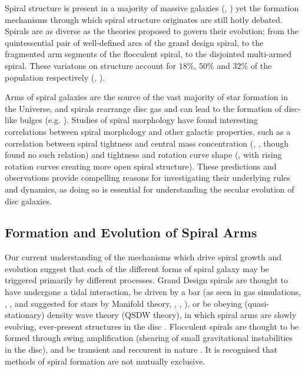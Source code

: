 
Spiral structure is present in a majority of massive galaxies (\citealt{1989gadv.book..151B}, \citealt{2008MNRAS.389.1179L}) yet the formation mechanisms through which spiral structure originates are still hotly debated. Spirals are as diverse as the theories proposed to govern their evolution; from the quintessential pair of well-defined arcs of the grand design spiral, to the fragmented arm segments of the flocculent spiral, to the disjointed multi-armed spiral. These variatons on structure account for $18\%$, $50\%$ and $32\%$ of the population respectively (\citealt{2011ApJ...737...32E}, \citealt{2015yCat..22170032B}).

Arms of spiral galaxies are the source of the vast majority of star formation in the Universe, and spirals rearrange disc gas and can lead to the formation of disc-like bulges (e.g. \citealt{2004ARA&A..42..603K}). Studies of spiral morphology have found interesting correlations between spiral morphology and other galactic properties, such as a correlation between spiral tightness and central mass concentration (\citealt{2019ApJ...871..194Y}, \citealt{2015PhDT........14D}, though \citealt{2017MNRAS.472.2263H} found no such relation) and tightness and rotation curve shape (\citealt{2005MNRAS.359.1065S}, with rising rotation curves creating more open spiral structure). These predictions and observations provide compelling reasons for investigating their underlying rules and dynamics, as doing so is essential for understanding the secular evolution of disc galaxies.

\subsection{Formation and Evolution of Spiral Arms}

Our current understanding of the mechanisms which drive spiral growth and evolution suggest that each of the different forms of spiral galaxy may be triggered primarily by different processes. Grand Design spirals are thought to have undergone a tidal interaction, be driven by a bar (as seen in gas simulations, \citealt{1976ApJ...209...53S}, \citealt{2008A&A...489..115R}, and suggested for stars by Manifold theory, \citealt{2006A&A...453...39R}, \citealt{2009MNRAS.394...67A}, \citealt{2009MNRAS.400.1706A}), or be obeying (quasi-stationary) density wave theory (QSDW theory), in which spiral arms are slowly evolving, ever-present structures in the disc \citep{1964ApJ...140..646L}. Flocculent spirals are thought to be formed through swing amplification (shearing of small gravitational instabilities in the disc), and be transient and reccurent in nature \citep{1966ApJ...146..810J}. It is recognised that methods of spiral formation are not mutually exclusive.

